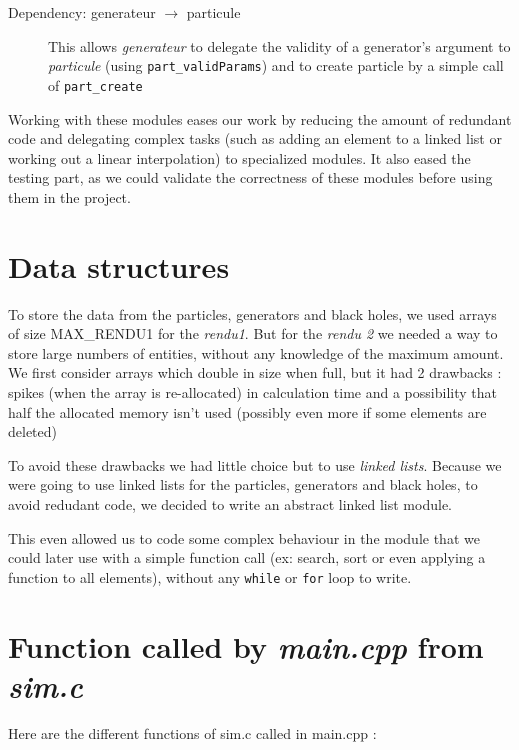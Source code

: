 \documentclass[a4paper]{article} %
\begin{document}
\begin{multicols*}{2}
\begin{description}
\item[Dependency: generateur $\rightarrow$ particule]
This allows \emph{generateur} to delegate the validity of a generator's argument to \emph{particule}
(using \texttt{part\_validParams}) 
and to create particle by a simple call of \texttt{part\_create}
\end{description}

Working with these modules eases our work by reducing the amount of redundant code and delegating complex tasks
(such as adding an element to a linked list or working out a linear interpolation) to specialized modules.
It also eased the testing part, as we could validate the correctness of these modules before using them in the project.

\section{Data structures}

To store the data from the particles, generators and black holes,
we used arrays of size MAX\_RENDU1 for the \emph{rendu1}.
But for the \emph{rendu 2} we needed a way to store large numbers of entities,
without any knowledge of the maximum amount.
We first consider arrays which double in size when full, but it had 2 drawbacks :
spikes (when the array is re-allocated) in calculation time
and a possibility that half the allocated memory isn't used (possibly even more if some elements are deleted)

To avoid these drawbacks we had little choice but to use \emph{linked lists}.
Because we were going to use linked lists for the particles, generators and black holes, to avoid redudant code,
we decided to write an abstract linked list module.

This even allowed us to code some complex behaviour in the module that we could later use with a simple function call
(ex: search, sort or even applying a function to all elements), without any \texttt{while} or \texttt{for} loop to write.



\section{Function called by \emph{main.cpp} from \emph{sim.c}}
Here are the different functions of sim.c called in main.cpp :


\end{multicols*}
\end{document}
